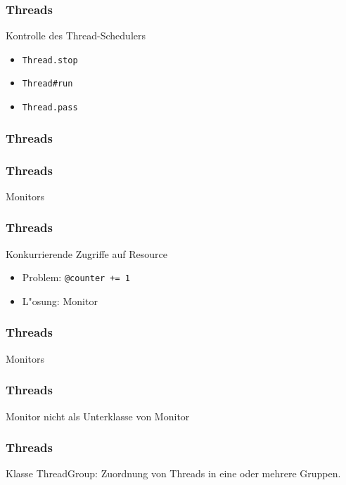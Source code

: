 \documentclass{beamer}
\begin{document}
\begin{frame}
  \frametitle{Threads}
  Kontrolle des Thread-Schedulers
  \begin{itemize}
    \item \texttt{Thread.stop} 
    \item \texttt{Thread\#run}
    \item \texttt{Thread.pass}
  \end{itemize}
\end{frame}

\begin{frame}
  \frametitle{Threads}
  
\end{frame}

\begin{frame}
  \frametitle{Threads}
  Monitors
  
\end{frame}

\begin{frame}
  \frametitle{Threads}
  Konkurrierende Zugriffe auf Resource
  \begin{itemize}
    \item Problem: \texttt{@counter += 1}\\
    \pause
    \item L"osung: Monitor
  \end{itemize}
\end{frame}

\begin{frame}
  \frametitle{Threads}
  Monitors
  
\end{frame}

\begin{frame}
  \frametitle{Threads}
  Monitor nicht als Unterklasse von Monitor
  
\end{frame}

\begin{frame}
  \frametitle{Threads}
  Klasse ThreadGroup: Zuordnung von Threads in eine oder mehrere Gruppen.
\end{frame}

\end{document}
